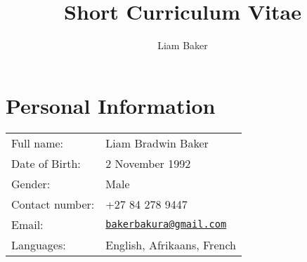 \documentclass{article}
\author{Liam Baker}
\title{Short Curriculum Vitae}
\date{\vspace{-24pt}}
\begin{document}
 \maketitle \thispagestyle{empty}

\section{Personal Information} \begin{center} \begin{tabular}{ll}

	Full name: 					    	& Liam Bradwin Baker \\
	Date of Birth:					  & 2 November 1992 \\
	Gender: 							    & Male \\
	Contact number: 				  & +27 84 278 9447 \\
	Email:							      & \href{mailto:bakerbakura@gmail.com}{\texttt{bakerbakura@gmail.com}} \\
	Languages:						    & English, \footnotesize{Afrikaans}, \tiny{French} \\ 

\end{tabular} \end{center}
\end{document}
